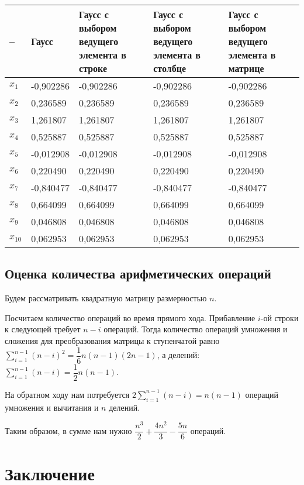 \documentclass[14pt, a4paper]{extarticle}
\begin{document}
\begin{enumerate}
\begin{tabular}{ |P{1em}|P{7em}|P{7em}|P{7em}|P{7em}| }
			 			-- & Гаусс & Гаусс с выбором ведущего элемента в строке & Гаусс с выбором ведущего элемента в столбце&Гаусс с выбором ведущего элемента в матрице\\
			 			\hline
			 			$x_1$ & -0,902286 &  -0,902286 & -0,902286 & -0,902286\\
			 			\hline 
			 			$x_2$ & 0,236589 &  0,236589 & 0,236589 & 0,236589\\
			 			\hline
			 			$x_3$ & 1,261807 &  1,261807 & 1,261807 & 1,261807\\
			 			\hline
			 			$x_4$ & 0,525887 &  0,525887 & 0,525887 & 0,525887\\
			 			\hline
			 			$x_5$ & -0,012908 &  -0,012908 & -0,012908 & -0,012908\\
			 			\hline
			 			$x_6$ & 0,220490 &  0,220490 & 0,220490 & 0,220490\\
			 			\hline
			 			$x_7$ & -0,840477 &  -0,840477 & -0,840477 & -0,840477\\
			 			\hline
			 			$x_8$ & 0,664099 &  0,664099 & 0,664099 & 0,664099\\
			 			\hline
			 			$x_9$ & 0,046808 &  0,046808 & 0,046808 & 0,046808\\
			 			\hline
			 			$x_{10}$ & 0,062953 &  0,062953 & 0,062953 & 0,062953\\
			 			\hline
		 			\end{tabular}
		\end{enumerate}
	\subsection{Оценка количества арифметических операций}
		Будем рассматривать квадратную матрицу размерностью $n$. 
		
		Посчитаем количество операций во время прямого хода. Прибавление $i$-ой строки к следующей требует $n-i$ операций. Тогда количество операций умножения и сложения для преобразования матрицы к ступенчатой равно $\sum_{i=1}^{n-1} (n-i)^2 = \dfrac{1}{6}n(n-1)(2n-1) $, а делений: $\sum_{i=1}^{n-1} (n-i) = \dfrac{1}{2}n(n-1)$.
		
		На обратном ходу нам потребуется $2 \sum_{i=1}^{n-1} (n-i) = n(n-1)$ операций умножения и вычитания и $n$ делений.
		
		Таким образом, в сумме нам нужно $\dfrac{n^3}{2} + \dfrac{4n^2}{3}-\dfrac{5n}{6}$ операций.
	\section{Заключение}
	
\end{document}
